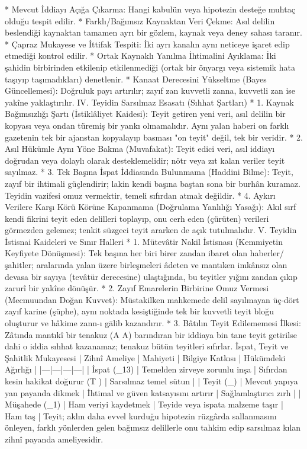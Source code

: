 \documentclass[11pt,a4paper]{article}
\begin{document}
 * Mevcut İddiayı Açığa Çıkarma: Hangi kabulün veya hipotezin desteğe muhtaç olduğu tespit edilir.
 * Farklı/Bağımsız Kaynaktan Veri Çekme: Asıl delilin beslendiği kaynaktan tamamen ayrı bir gözlem, kaynak veya deney sahası taranır.
 * Çapraz Mukayese ve İttifak Tespiti: İki ayrı kanalın aynı neticeye işaret edip etmediği kontrol edilir.
 * Ortak Kaynaklı Yanılma İhtimalini Ayıklama: İki şahidin birbirinden etkilenip etkilenmediği (ortak bir önyargı veya sistemik hata taşıyıp taşımadıkları) denetlenir.
 * Kanaat Derecesini Yükseltme (Bayes Güncellemesi): Doğruluk payı artırılır; zayıf zan kuvvetli zanna, kuvvetli zan ise yakîne yaklaştırılır.
IV. Teyidin Sarsılmaz Esasatı (Sıhhat Şartları)
 * 1. Kaynak Bağımsızlığı Şartı (İstiklâliyet Kaidesi):
   Teyit getiren yeni veri, asıl delilin bir kopyası veya ondan türemiş bir yankı olmamalıdır. Aynı yalan haberi on farklı gazetenin tek bir ajanstan kopyalayıp basması "on teyit" değil, tek bir veridir.
 * 2. Asıl Hükümle Aynı Yöne Bakma (Muvafakat):
   Teyit edici veri, asıl iddiayı doğrudan veya dolaylı olarak desteklemelidir; nötr veya zıt kalan veriler teyit sayılmaz.
 * 3. Tek Başına İspat İddiasında Bulunmama (Haddini Bilme):
   Teyit, zayıf bir ihtimali güçlendirir; lakin kendi başına baştan sona bir burhân kuramaz. Teyidin vazifesi omuz vermektir, temeli sıfırdan atmak değildir.
 * 4. Aykırı Verilere Karşı Körü Körüne Kapanmama (Doğrulama Yanlılığı Yasağı):
   Akıl sırf kendi fikrini teyit eden delilleri toplayıp, onu cerh eden (çürüten) verileri görmezden gelemez; tenkit süzgeci teyit ararken de açık tutulmalıdır.
V. Teyidin İstisnai Kaideleri ve Sınır Halleri
 * 1. Mütevâtir Nakil İstisnası (Kemmiyetin Keyfiyete Dönüşmesi):
   Tek başına her biri birer zandan ibaret olan haberler/şahitler; aralarında yalan üzere birleşmeleri âdeten ve mantıken imkânsız olan devasa bir sayıya (tevâtür derecesine) ulaştığında, bu teyitler yığını zandan çıkıp zarurî bir yakîne dönüşür.
 * 2. Zayıf Emarelerin Birbirine Omuz Vermesi (Mecmuundan Doğan Kuvvet):
   Müstakilken mahkemede delil sayılmayan üç-dört zayıf karine (şüphe), aynı noktada kesiştiğinde tek bir kuvvetli teyit bloğu oluşturur ve hâkime zann-ı gālib kazandırır.
 * 3. Bâtılın Teyit Edilememesi İlkesi:
   Zâtında mantıkî bir tenakuz (A \wedge \neg A) barındıran bir iddiaya bin tane teyit getirilse dahi o iddia sıhhat kazanamaz; tenakuz bütün teyitleri sıfırlar.
İspat, Teyit ve Şahitlik Mukayesesi
| Zihnî Ameliye | Mahiyeti | Bilgiye Katkısı | Hükümdeki Ağırlığı |
|---|---|---|---|
| İspat (_{13}) | Temelden zirveye zorunlu inşa | Sıfırdan kesin hakikat doğurur (T ) | Sarsılmaz temel sütun |
| Teyit (_{}) | Mevcut yapıya yan payanda dikmek | İhtimal ve güven katsayısını artırır | Sağlamlaştırıcı zırh |
| Müşahede (_1) | Ham veriyi kaydetmek | Teyide veya ispata malzeme taşır | Ham taş |
Teyit; aklın daha evvel kurduğu hipotezin rüzgârda sallanmasını önleyen, farklı yönlerden gelen bağımsız delillerle onu tahkim edip sarsılmaz kılan zihnî payanda ameliyesidir.
\end{document}

